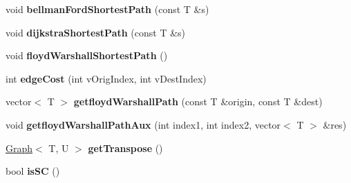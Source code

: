 \begin{DoxyCompactItemize}
\item 
void {\bfseries bellman\+Ford\+Shortest\+Path} (const T \&s)\hypertarget{class_graph_a2e330722075bf54e3650cd98b845f980}{}\label{class_graph_a2e330722075bf54e3650cd98b845f980}

\item 
void {\bfseries dijkstra\+Shortest\+Path} (const T \&s)\hypertarget{class_graph_a23ccd58c60b6408366b854c0f8e40a54}{}\label{class_graph_a23ccd58c60b6408366b854c0f8e40a54}

\item 
void {\bfseries floyd\+Warshall\+Shortest\+Path} ()\hypertarget{class_graph_aea189a3a715af95089600ec130d45b36}{}\label{class_graph_aea189a3a715af95089600ec130d45b36}

\item 
int {\bfseries edge\+Cost} (int v\+Orig\+Index, int v\+Dest\+Index)\hypertarget{class_graph_ae7f7671fbc1fe1e82a2c8dc1f63d8258}{}\label{class_graph_ae7f7671fbc1fe1e82a2c8dc1f63d8258}

\item 
vector$<$ T $>$ {\bfseries getfloyd\+Warshall\+Path} (const T \&origin, const T \&dest)\hypertarget{class_graph_a0c4eab2a6a67d959b12e91a35d2ab3c7}{}\label{class_graph_a0c4eab2a6a67d959b12e91a35d2ab3c7}

\item 
void {\bfseries getfloyd\+Warshall\+Path\+Aux} (int index1, int index2, vector$<$ T $>$ \&res)\hypertarget{class_graph_ab3226b15441ef6ca6528317d78124c53}{}\label{class_graph_ab3226b15441ef6ca6528317d78124c53}

\item 
\hyperlink{class_graph}{Graph}$<$ T, U $>$ {\bfseries get\+Transpose} ()\hypertarget{class_graph_ab0e8ed050779cf36cfbf5ce8930d1986}{}\label{class_graph_ab0e8ed050779cf36cfbf5ce8930d1986}

\item 
bool {\bfseries is\+SC} ()\hypertarget{class_graph_a371738cce01787b1f38de6d54380e6a4}{}\label{class_graph_a371738cce01787b1f38de6d54380e6a4}

\end{DoxyCompactItemize}
